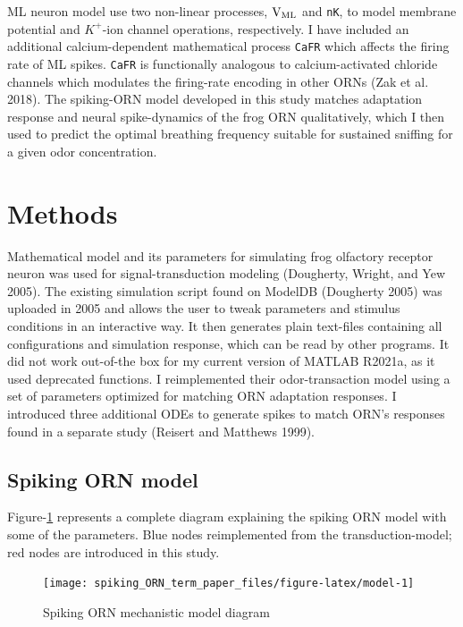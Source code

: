 \documentclass[
]{article}
\begin{document}
ML neuron model use two non-linear processes, \(\rm V_{ML}\) and \texttt{nK}, to model membrane potential and \(K^+\)-ion channel operations, respectively. I have included an additional calcium-dependent mathematical process \texttt{CaFR} which affects the firing rate of ML spikes. \texttt{CaFR} is functionally analogous to calcium-activated chloride channels which modulates the firing-rate encoding in other ORNs (Zak et al. 2018). The spiking-ORN model developed in this study matches adaptation response and neural spike-dynamics of the frog ORN qualitatively, which I then used to predict the optimal breathing frequency suitable for sustained sniffing for a given odor concentration.

\hypertarget{methods}{%
\section{Methods}\label{methods}}

Mathematical model and its parameters for simulating frog olfactory receptor neuron was used for signal-transduction modeling (Dougherty, Wright, and Yew 2005). The existing simulation script found on ModelDB (Dougherty 2005) was uploaded in 2005 and allows the user to tweak parameters and stimulus conditions in an interactive way. It then generates plain text-files containing all configurations and simulation response, which can be read by other programs. It did not work out-of-the box for my current version of MATLAB R2021a, as it used deprecated functions. I reimplemented their odor-transaction model using a set of parameters optimized for matching ORN adaptation responses. I introduced three additional ODEs to generate spikes to match ORN's responses found in a separate study (Reisert and Matthews 1999).

\hypertarget{spiking-orn-model}{%
\subsection{Spiking ORN model}\label{spiking-orn-model}}

Figure-\ref{fig:model} represents a complete diagram explaining the spiking ORN model with some of the parameters. Blue nodes reimplemented from the transduction-model; red nodes are introduced in this study.

\begin{figure}

{\centering \texttt{[image: spiking\_ORN\_term\_paper\_files/figure-latex/model-1]} 

}

\caption{Spiking ORN mechanistic model diagram}\label{fig:model}
\end{figure}
\end{document}

